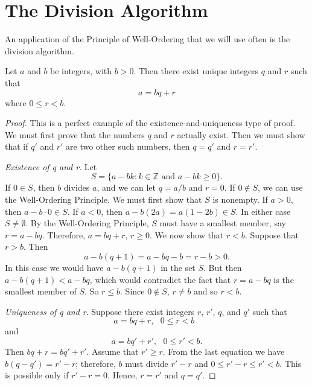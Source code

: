 
\section{The Division Algorithm}\label{integers_division_algorithm}

An application of the Principle of Well-Ordering that we will use often is the division algorithm. 

\begin{theorem}\label{integers_theorem_division_alg}
Let $a$ and $b$ be integers, with $b > 0$.  Then there exist unique integers $q$ and $r$ such that 
$$
a = bq + r
$$
where $0 \leq r < b$.
\end{theorem}

\begin{proof}
This is a perfect example of the existence-and-uniqueness type of proof.  We must first prove that the numbers $q$ and $r$ actually  exist. Then we must show that if  $q'$ and $r'$ are two other such numbers, then $q = q'$ and $r = r'$. 
 
{\em Existence of q and r}.
Let
$$
S = \{ a - bk : k \in {\mathbb Z} \mbox{ and } a - bk \geq 0 \}.
$$
If $0 \in S$, then $b$ divides $a$, and  we can let $q = a/b$ and $r = 0$.  If $0 \notin S$, we can use the Well-Ordering Principle.  We must first show that $S$ is nonempty.  If $a > 0$, then $a - b \cdot 0 \in S$. If $a < 0$, then $a - b(2a) = a(1 - 2b) \in S$.  In either case $S \neq \emptyset$.  By the Well-Ordering Principle, $S$ must have a smallest member, say $r = a - bq$. Therefore, $a = bq + r$, $r \geq 0$. We now show that $r < b$. Suppose that $r > b$. Then   
$$
a - b(q + 1)= a - bq - b = r - b > 0.
$$
In this case we would have $a - b(q + 1)$ in the set $S$. But then $a - b(q + 1) < a - bq$, which would contradict the fact that $r = a - bq$ is the smallest member  of $S$. So $r \leq b$.  Since $0 \notin S$, $r \neq b$ and so $r < b$. 
 
{\em Uniqueness of q and r}.
Suppose there exist integers $r$, $r'$, $q$, and $q'$ such that
$$
a = bq + r, \mbox{ $0 \leq r < b$ }
$$
and
$$
a = bq' + r', \mbox{  $0 \leq r' < b$}.
$$
Then $ bq + r =  bq' + r'$.  Assume that $r' \geq r$.  From the last equation we have $b(q - q') = r' - r$; therefore, $b$ must divide $r' - r$ and $0 \leq r'- r \leq r' < b$.  This is possible only if $r' - r = 0$.  Hence, $r = r'$ and  $q = q'$. 
\end{proof}

\medskip

